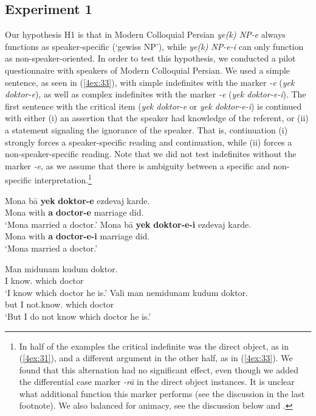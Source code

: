 \documentclass[output=paper]{langsci/langscibook}
\begin{document}
\subsection{Experiment 1}\label{4sec:51}

{
Our hypothesis H1 is that in Modern Colloquial Persian {\emph{ye(k) NP-e}} always functions as speaker-specific (`gewiss NP'), while {\emph{ye(k) NP-e-i}} can only function as non-speaker-oriented. In order to test this hypothesis, we conducted a pilot questionnaire with speakers of Modern Colloquial Persian. We used a simple sentence, as seen in (\ref{4ex:33}), with simple indefinites with the marker {\emph{-e}} ({\emph{yek doktor-e}}), as well as complex indefinites with the marker {\emph{-e}} ({\emph{yek doktor-e-i}}). The first sentence with the critical item ({\emph{yek doktor-e}} or {\emph{yek doktor-e-i}}) is continued with either (i) an assertion that the speaker had knowledge of the referent, or (ii) a statement signaling the ignorance of the speaker. That is, continuation (i) strongly forces a speaker-specific reading and continuation, while (ii) forces a non-speaker-spe\-cif\-ic reading. Note that we did not test indefinites without the marker {\emph{-e}}, as we assume that there is ambiguity between a specific and non-specific interpretation.\footnote{In half of the examples the critical indefinite was the direct object, as in (\ref{4ex:31}), and a different argument in the other half, as in (\ref{4ex:33}). We found that this alternation had no significant effect, even though we added the differential case marker {\emph{-rā}} in the direct object instances. It is unclear what additional function this marker performs (see the discussion in the last footnote). We also balanced for animacy, see the discussion below and .}
}

\begin{exe}
\ex\label{4ex:33}
	\begin{xlista}
	\ex\label{4ex:33a}
	\gll	Mona bā  		{\bf{yek}} {\bf{doktor-e}}  	ezdevaj karde. \\
		Mona with  	{\bf{a}} {\bf{doctor-e}}  	marriage did.{} \\
	\glt	`Mona married a doctor.'
	\ex\label{4ex:33b}
	\gll	Mona bā  	{\bf{yek}} {\bf{doktor-e-i}}  	ezdevaj karde. \\
		Mona with  	{\bf{a}} {\bf{doctor-e-i}}  	marriage did.{} \\
	\glt	`Mona married a doctor.'
		\begin{xlista}
		\gll	Man midunam kudum 	doktor. \\
			I  	 know.{}	which	doctor \\
		\glt	`I know which doctor he is.'
		\gll	Vali man nemidunam    	kudum 	doktor. \\
			but  I       not.know.{}    which    doctor \\
		\glt	`But I do not know which doctor he is.'
		\end{xlista}
	\end{xlista}
\end{exe}
\end{document}

